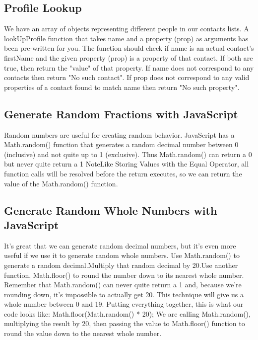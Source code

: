 \documentclass{article}%
\begin{document}
%
\subsection{Profile Lookup}%
\label{subsec:ProfileLookup}%
We have an array of objects representing different people in our contacts lists.\newline%
A lookUpProfile function that takes name and a property (prop) as arguments has been pre{-}written for you.\newline%
The function should check if name is an actual contact's firstName and the given property (prop) is a property of that contact.\newline%
If both are true, then return the "value" of that property.\newline%
If name does not correspond to any contacts then return "No such contact".\newline%
If prop does not correspond to any valid properties of a contact found to match name then return "No such property".\newline%

%
\subsection{Generate Random Fractions with JavaScript}%
\label{subsec:GenerateRandomFractionswithJavaScript}%
Random numbers are useful for creating random behavior.\newline%
JavaScript has a Math.random() function that generates a random decimal number between 0 (inclusive) and not quite up to 1 (exclusive). Thus Math.random() can return a 0 but never quite return a 1\newline%
NoteLike Storing Values with the Equal Operator, all function calls will be resolved before the return executes, so we can return the value of the Math.random() function.\newline%

%
\subsection{Generate Random Whole Numbers with JavaScript}%
\label{subsec:GenerateRandomWholeNumberswithJavaScript}%
It's great that we can generate random decimal numbers, but it's even more useful if we use it to generate random whole numbers.\newline%
Use Math.random() to generate a random decimal.Multiply that random decimal by 20.Use another function, Math.floor() to round the number down to its nearest whole number.\newline%
Remember that Math.random() can never quite return a 1 and, because we're rounding down, it's impossible to actually get 20. This technique will give us a whole number between 0 and 19.\newline%
Putting everything together, this is what our code looks like:\newline%
Math.floor(Math.random() * 20);\newline%
We are calling Math.random(), multiplying the result by 20, then passing the value to Math.floor() function to round the value down to the nearest whole number.\newline%
\end{document}

